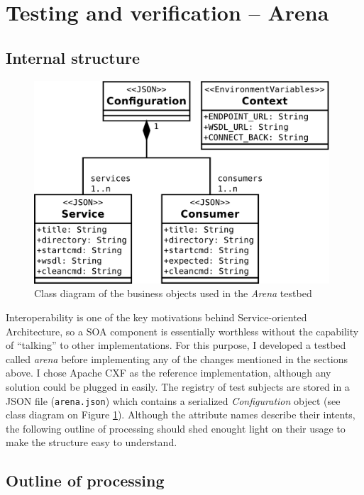 \section{Testing and verification -- Arena}
\label{arena}

\subsection{Internal structure}

\begin{figure}[htbp]
 \centering
 \includegraphics[width=11cm]{images/clsdArena.pdf}
 \caption{Class diagram of the business objects used in the \emph{Arena} testbed}
 \label{fig:clsdArena}
\end{figure}

Interoperability is one of the key motivations behind Service-oriented Architecture, so a SOA component is essentially worthless without the capability of ``talking'' to other implementations. For this purpose, I developed a testbed called \emph{arena} before implementing any of the changes mentioned in the sections above. I chose Apache CXF as the reference implementation, although any solution could be plugged in easily. The registry of test subjects are stored in a JSON file (\verb|arena.json|) which contains a serialized \emph{Configuration} object (see class diagram on Figure \ref{fig:clsdArena}). Although the attribute names describe their intents, the following outline of processing should shed enought light on their usage to make the structure easy to understand.

\subsection{Outline of processing}

